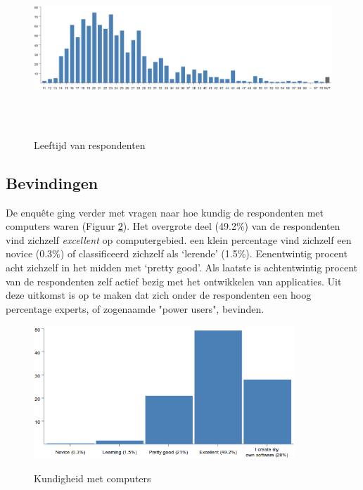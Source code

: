 \documentclass[a4paper, 10pt, pdftex]{report}
\begin{document}
        \begin{figure}
          \begin{center}
          \caption{Leeftijd van respondenten}
            \includegraphics[height=58mm, angle=90]{../images/enquete/age}
          \label{fig:age}

          \end{center}
        \end{figure}

     \newpage
      \subsection{Bevindingen}
        De enqu\^ete ging verder met vragen naar hoe kundig de respondenten met computers waren (Figuur \ref{fig:skill}). Het overgrote deel (49.2\%) van de respondenten vind zichzelf \emph{excellent} op computergebied. een klein percentage vind zichzelf een novice (0.3\%) of classificeerd zichzelf als `lerende' (1.5\%). Eenentwintig procent acht zichzelf in het midden met `pretty good'. Als laatste is achtentwintig procent van de respondenten zelf actief bezig met het ontwikkelen van applicaties. Uit deze uitkomst is op te maken dat zich onder de respondenten een hoog percentage experts, of zogenaamde "power users", bevinden.
        \begin{figure}
          \begin{center}
          \caption{Kundigheid met computers}
            \includegraphics[height=50mm]{../images/enquete/good-with-computers}
          \label{fig:skill}
          \end{center}
        \end{figure}
\end{document}

